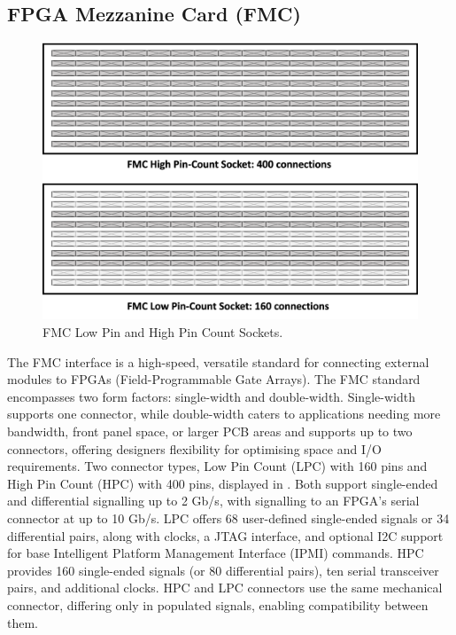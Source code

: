 \subsection{FPGA Mezzanine Card (FMC)}
\begin{figure}[h]
\centering
\includegraphics[width=0.7\linewidth]{Images/FMCPincount.png}
\caption[FMC Architecture]{FMC Low Pin and High Pin Count Sockets.}
\label{fig:FMC}
\end{figure} 

The FMC interface is a high-speed, versatile standard for connecting external modules to FPGAs (Field-Programmable Gate Arrays). The FMC standard encompasses two form factors: single-width and double-width. Single-width supports one connector, while double-width caters to applications needing more bandwidth, front panel space, or larger PCB areas and supports up to two connectors, offering designers flexibility for optimising space and I/O requirements. Two connector types, Low Pin Count (LPC) with 160 pins and High Pin Count (HPC) with 400 pins, displayed in . Both support single-ended and differential signalling up to 2 Gb/s, with signalling to an FPGA's serial connector at up to 10 Gb/s. LPC offers 68 user-defined single-ended signals or 34 differential pairs, along with clocks, a JTAG interface, and optional I2C support for base Intelligent Platform Management Interface (IPMI) commands. HPC provides 160 single-ended signals (or 80 differential pairs), ten serial transceiver pairs, and additional clocks. HPC and LPC connectors use the same mechanical connector, differing only in populated signals, enabling compatibility between them.





